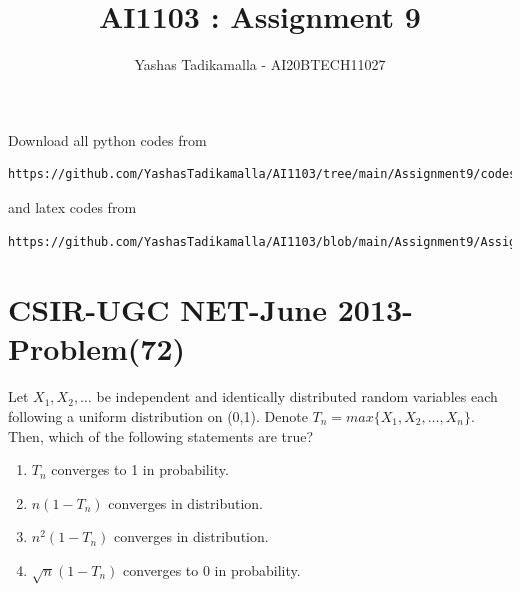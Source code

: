 \documentclass[journal,12pt,twocolumn]{IEEEtran}
\begin{document}
\let\vec\mathbf
\renewcommand{\thefigure}{\theproblem}
\def\putbox#1#2#3{\makebox[0in][l]{\makebox[#1][l]{}\raisebox{\baselineskip}[0in][0in]{\raisebox{#2}[0in][0in]{#3}}}}
     \def\rightbox#1{\makebox[0in][r]{#1}}
     \def\centbox#1{\makebox[0in]{#1}}
     \def\topbox#1{\raisebox{-\baselineskip}[0in][0in]{#1}}
     \def\midbox#1{\raisebox{-0.5\baselineskip}[0in][0in]{#1}}
\vspace{3cm}
\title{AI1103 : Assignment 9}
\author{Yashas Tadikamalla - AI20BTECH11027}
\maketitle
\newpage
\bigskip
\renewcommand{\thefigure}{\arabic{figure}}
\renewcommand{\thetable}{\arabic{table}}
Download all python codes from 
\begin{lstlisting}
https://github.com/YashasTadikamalla/AI1103/tree/main/Assignment9/codes
\end{lstlisting}
%
and latex codes from 
%
\begin{lstlisting}
https://github.com/YashasTadikamalla/AI1103/blob/main/Assignment9/Assignment9.tex
\end{lstlisting}
\section*{CSIR-UGC NET-June 2013-Problem(72)}
Let $X_{1},X_{2},\dots$ be independent and identically distributed random variables each following a uniform distribution on (0,1). Denote $T_{n}=max\{ X_{1},X_{2},\dots,X_{n}\}$. Then, which of the following statements are true?
\begin{enumerate}
    \item $T_{n}$ converges to 1 in probability.
    \item $n(1-T_{n})$ converges in distribution.
    \item $n^{2}(1-T_{n})$ converges in distribution.
    \item $\sqrt{n}(1-T_{n})$ converges to 0 in probability.
\end{enumerate}
\end{document}
